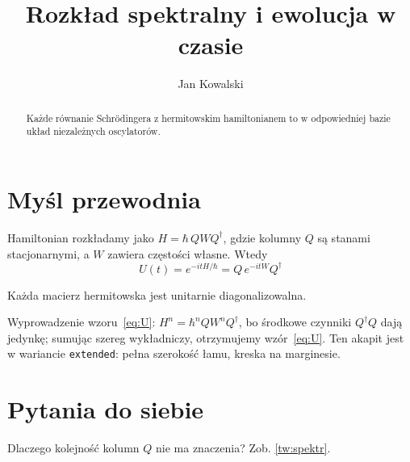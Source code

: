 \documentclass[a4paper, polish, 11pt]{scrartcl}
\title{Rozkład spektralny i ewolucja w czasie}
\author{Jan Kowalski}
\date{}   %
\begin{document}
\maketitle

\begin{abstract}
Każde równanie Schrödingera z hermitowskim hamiltonianem to
w odpowiedniej bazie układ niezależnych oscylatorów.
\end{abstract}

\begincolumns

\section{Myśl przewodnia}
Hamiltonian rozkładamy jako $H = \hbar\,QWQ^\dagger$, gdzie kolumny $Q$
są stanami stacjonarnymi, a $W$ zawiera częstości własne. Wtedy
\begin{equation}
	U(t) = e^{-itH/\hbar} = Q\,e^{-itW}Q^\dagger
	\label{eq:U}
\end{equation}

\begin{theorem}\label{tw:spektr}
Każda macierz hermitowska jest unitarnie diagonalizowalna.
\end{theorem}

\begin{extended}
Wyprowadzenie wzoru~\eqref{eq:U}: $H^n = \hbar^n QW^nQ^\dagger$, bo środkowe
czynniki $Q^\dagger Q$ dają jedynkę; sumując szereg wykładniczy,
otrzymujemy wzór~\eqref{eq:U}. Ten akapit jest w wariancie
\texttt{extended}: pełna szerokość łamu, kreska na marginesie.
\end{extended}

\section{Pytania do siebie}
Dlaczego kolejność kolumn $Q$ nie ma znaczenia? Zob. \cref{tw:spektr}.
\end{document}
